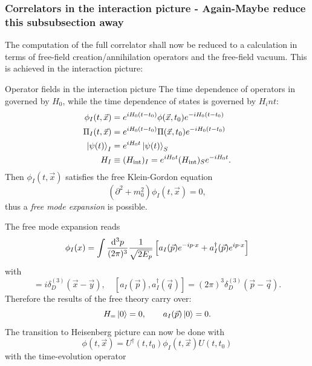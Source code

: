 \subsubsection{Correlators in the interaction picture - Again-Maybe reduce this subsubsection away}
The computation of the full correlator shall now be reduced to a calculation in terms of free-field creation/annihilation operators and the free-field vacuum. This is achieved in the interaction picture: 
\begin{mybox}{Operator fields in the interaction picture}
	The time dependence of operators in governed by $H_0$, while the time dependence of states is governed by $H_int$:
	\begin{align}
		\phi_I(t,\vec{x}) &= e^{i H_0 (t-t_0)} \phi(\vec{x},t_0) e^{-i H_0 (t-t_0)} \\
		\Pi_I(t,\vec{x}) &= e^{i H_0 (t-t_0)} \Pi(\vec{x},t_0) e^{-i H_0 (t-t_0)} \\
		\ket{\psi(t)}_I &= e^{i H_0 t} \ket{\psi(t)}_S \\
		H_I &\equiv (H_{\mathrm{int}})_I = e^{i H_0 t} (H_{\mathrm{int}})_S e^{-i H_0 t}.
	\end{align}
	Then $\phi_I(t,\vec{x})$ satisfies the free Klein-Gordon equation
	\begin{equation}
	(\partial^2+m^2_0) \phi_I(t,\vec{x}) = 0,
	\end{equation}
	thus a \emph{free mode expansion} is possible.
\end{mybox}
The free mode expansion reads
\begin{equation}
\phi_I(x) = \int \frac{\mathrm{d}^3 p}{(2 \pi)^3} \frac{1}{\sqrt{2 E_p}} \left[a_I(\vec{p}) e^{-i p\cdot x} + a^{\dagger}_I(\vec{p}) e^{i p\cdot x} \right]
\end{equation}
with
\begin{equation}
[\phi_I(t,\vec{x}), \Pi_I(t,\vec{y})]=i \delta^{(3)}_D(\vec{x}-\vec{y}), \quad [a_I(\vec{p}),a^{\dagger}_I(\vec{q})] = (2 \pi)^3 \delta^{(3)}_D(\vec{p}-\vec{q}).
\end{equation}
Therefore the results of the free theory carry over:
\begin{equation}
H_= \ket{0}=0, \qquad a_I(\vec{p})\ket{0}=0.
\end{equation}
The transition to Heisenberg picture can now be done with
\begin{equation}
\phi(t,\vec{x}) = U^{\dagger}(t,t_0)  \phi_I(t,\vec{x}) U(t,t_0)
\end{equation}
with the time-evolution operator
